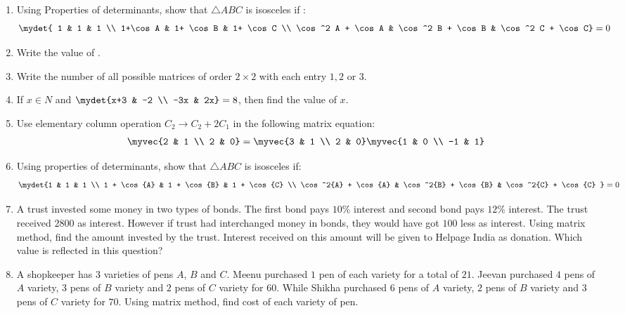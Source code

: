 \begin{enumerate}
    \item Using Properties of determinants, show that $\triangle ABC$ is isosceles if :
          \begin{align*}
              \mydet{
              1                 & 1                 & 1                       \\
              1+\cos A          & 1+ \cos B         & 1+ \cos C               \\
              \cos^2 A + \cos A & \cos^2 B + \cos B & \cos^2 C + \cos C} & =0
          \end{align*}
    \item Write the value of
          .
    \item Write the number of all possible matrices of order $2\times2$ with each entry $1, 2$ or $3$.
    \item If $ x \in N$ and $\mydet{x+3 & -2 \\ -3x & 2x} = 8$, then find the value of $x$.
    \item Use elementary column operation $ C_2 \rightarrow C_2  + 2C_1$ in the following matrix equation:
          \begin{align*} \myvec{2 & 1 \\ 2 & 0} &= \myvec{3 & 1 \\ 2 & 0}\myvec{1 & 0 \\ -1 & 1} \end{align*}
    \item Using properties of determinants, show that $\triangle{ABC}$ is isosceles if:
          \begin{align*}\mydet{1 & 1 & 1 \\ 1 + \cos{A} & 1 + \cos{B} & 1 + \cos{C} \\ \cos^2{A} + \cos{A} & \cos^2{B} + \cos{B} & \cos^2{C} + \cos{C} } = 0\end{align*}
    \item A trust invested some money in two types of bonds. The first bond pays $10\%$ interest and second bond pays $12\%$ interest. The trust received \rupee$2800$ as interest. However if trust had interchanged money in bonds, they would have got \rupee$100$ less as interest. Using matrix method, find the amount invested by the trust. Interest received on this amount will be given to Helpage India as donation. Which value is reflected in this question?
    \item A shopkeeper has $3$ varieties of pens $A$, $B$ and $C$. Meenu purchased $1$ pen of each variety for a total of \rupee$21$. Jeevan purchased $4$ pens of $A$ variety, $3$ pens of $B$ variety and $2$ pens of $C$ variety for \rupee$60$. While Shikha purchased $6$ pens of $A$ variety, $2$ pens of $B$ variety and $3$ pens of $C$ variety for \rupee$70$. Using matrix method, find cost of each variety of pen.

\end{enumerate}
